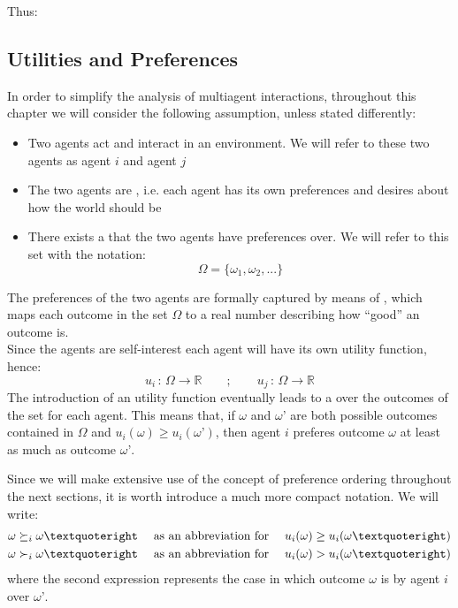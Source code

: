 	Thus:\\

\subsection{Utilities and Preferences}
In order to simplify the analysis of multiagent interactions, throughout this chapter we will consider the following assumption, unless stated differently:
	\begin{itemize}
	\item Two agents act and interact in an environment. We will refer to these two agents as agent $i$ and agent $j$
	\item The two agents are , i.e. each agent has its own preferences and desires about how the world should be
	\item There exists a  that the two agents have preferences over. We will refer to this set with the notation:
	\[\Omega = \{\omega_1, \omega_2,...\}\]
	\end{itemize}
	
	The preferences of the two agents are formally captured by means of , which maps each outcome in the set $\Omega$ to a real number describing how “good” an outcome is.\\
	Since the agents are self-interest each agent will have its own utility function, hence:
	\[u_i\,:\,\Omega\rightarrow\mathbb{R}\qquad;\qquad u_j\,:\,\Omega\rightarrow\mathbb{R}\]
	The introduction of an utility function eventually leads to a  over the outcomes of the set for each agent.
	This means that, if $\omega$ and $\omega’$ are both possible outcomes contained in $\Omega$ and $u_i(\omega)\ge u_i(\omega’)$, then agent $i$ preferes outcome $\omega$ at least as much as outcome $\omega’$.
	
	Since we will make extensive use of the concept of preference ordering throughout the next sections, it is worth introduce a much more compact notation. We will write:
	\begin{align*}
	\omega \cge_i \omega’ &&\text{ as an abbreviation for } && u_i(\omega) \ge u_i(\omega’)\\
	\omega \cmore_i \omega’ &&\text{ as an abbreviation for } && u_i(\omega) > u_i(\omega’)
	\end{align*}
	where the second expression represents the case in which outcome $\omega$ is  by agent $i$ over $\omega’$.
	
